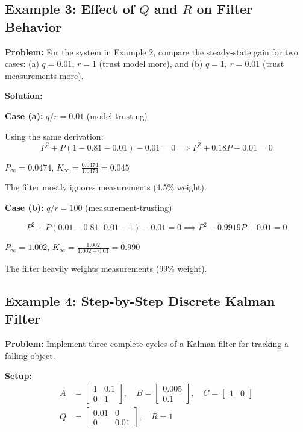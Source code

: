 \subsection{Example 3: Effect of $Q$ and $R$ on Filter Behavior}

\textbf{Problem:} For the system in Example 2, compare the steady-state gain for two cases: (a) $q = 0.01$, $r = 1$ (trust model more), and (b) $q = 1$, $r = 0.01$ (trust measurements more).

\textbf{Solution:}

\textbf{Case (a):} $q/r = 0.01$ (model-trusting)

Using the same derivation:
\begin{equation}
P^2 + P(1 - 0.81 - 0.01) - 0.01 = 0 \implies P^2 + 0.18P - 0.01 = 0
\end{equation}

$P_\infty = 0.0474$, $K_\infty = \frac{0.0474}{1.0474} = 0.045$

The filter mostly ignores measurements (4.5\% weight).

\textbf{Case (b):} $q/r = 100$ (measurement-trusting)

\begin{equation}
P^2 + P(0.01 - 0.81 \cdot 0.01 - 1) - 0.01 = 0 \implies P^2 - 0.9919P - 0.01 = 0
\end{equation}

$P_\infty = 1.002$, $K_\infty = \frac{1.002}{1.002 + 0.01} = 0.990$

The filter heavily weights measurements (99\% weight).

\subsection{Example 4: Step-by-Step Discrete Kalman Filter}

\textbf{Problem:} Implement three complete cycles of a Kalman filter for tracking a falling object.

\textbf{Setup:}
\begin{align}
A &= \begin{bmatrix} 1 & 0.1 \\ 0 & 1 \end{bmatrix}, \quad
B = \begin{bmatrix} 0.005 \\ 0.1 \end{bmatrix}, \quad
C = \begin{bmatrix} 1 & 0 \end{bmatrix} \\
Q &= \begin{bmatrix} 0.01 & 0 \\ 0 & 0.01 \end{bmatrix}, \quad R = 1
\end{align}

